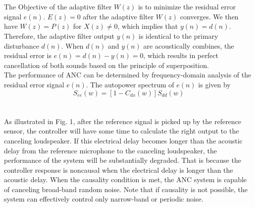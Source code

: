 \\
\\
The Objective of the adaptive filter $W(z)$ is to minimize the residual error signal $e(n)$. $E(z) = 0$ after the adaptive filter $W(z)$ converges. We then have $W(z) = P(z)$ for $X(z) \neq 0$, which implies that $y(n) = d(n)$. Therefore, the adaptive filter output $y(n)$ is identical to the primary disturbance $d(n)$. When $d(n)$ and $y(n)$ are acoustically combines, the residual error is $e(n) = d(n) - y(n) = 0$, which results in perfect cancellation of both sounds based on the principle of superposition.\\
The performance of ANC can be determined by frequency-domain analysis of the residual error signal $e(n)$. The autopower spectrum of $e(n)$ is given by $$S_{ee}(w) = [1-C_{dx}(w)]S_{dd}(w)$$ \cite{Kuo1999}
\\
\\
As illustrated in Fig. 1, after the reference signal is
picked up by the reference sensor, the controller will have
some time to calculate the right output to the canceling
loudspeaker. If this electrical delay becomes longer than
the acoustic delay from the reference microphone to the
canceling loudspeaker, the performance of the system will
be substantially degraded. That is because the controller
response is noncausal when the electrical delay is longer
than the acoustic delay. When the causality condition is met,
the ANC system is capable of canceling broad-band random
noise. Note that if causality is not possible, the system can
effectively control only narrow-band or periodic noise.
\cite{Kuo1999}
